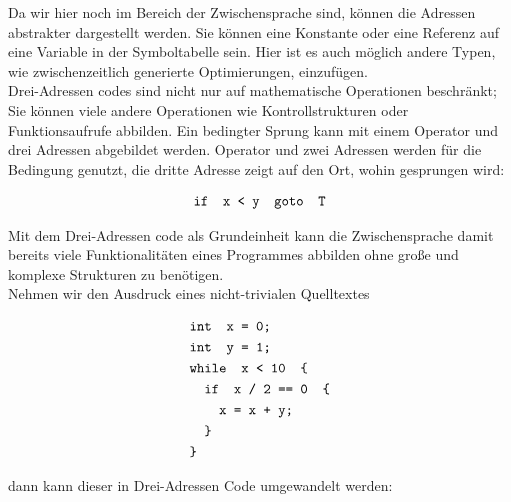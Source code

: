 Da wir hier noch im Bereich der Zwischensprache sind, können die Adressen abstrakter dargestellt werden.
Sie können eine Konstante oder eine Referenz auf eine Variable in der Symboltabelle sein.
Hier ist es auch möglich andere Typen, wie zwischenzeitlich generierte Optimierungen, einzufügen\cite{aho:2006}.\\

Drei-Adressen codes sind nicht nur auf mathematische Operationen beschränkt;
Sie können viele andere Operationen wie Kontrollstrukturen oder Funktionsaufrufe abbilden.
Ein bedingter Sprung kann mit einem Operator und drei Adressen abgebildet werden.
Operator und zwei Adressen werden für die Bedingung genutzt, die dritte Adresse zeigt auf den Ort, wohin gesprungen wird:

\begin{figure}[H]
  \begin{align*}
    \texttt{\text{if } x < y \text{ goto } T}
  \end{align*}
\end{figure}

Mit dem Drei-Adressen code als Grundeinheit kann die Zwischensprache damit bereits viele Funktionalitäten eines Programmes abbilden ohne große und komplexe Strukturen zu benötigen.\\
Nehmen wir den Ausdruck eines nicht-trivialen Quelltextes

\begin{figure}[H]
  \begin{align*}
    &\texttt{\text{int } x = 0;}\\
    &\texttt{\text{int } y = 1;}\\
    &\texttt{\text{while } x < 10 \text{ \{}}\\
    &\texttt{\quad\text{if } x\ /\ 2\ ==\ 0 \text{ \{}}\\
    &\texttt{\quad\quad x = x + y;}\\
    &\texttt{\quad\text{\}}}\\
    &\texttt{\text{\}}}
  \end{align*}
\end{figure}

dann kann dieser in Drei-Adressen Code umgewandelt werden:



